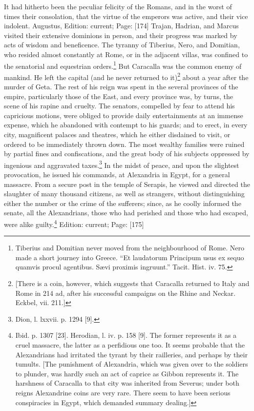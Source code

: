 It had hitherto been the peculiar felicity of the Romans, and in the worst of times their consolation, that the virtue of the emperors was active, and their vice indolent. Augustus, Edition: current; Page: [174] Trajan, Hadrian, and Marcus visited their extensive dominions in person, and their progress was marked by acts of wisdom and beneficence. The tyranny of Tiberius, Nero, and Domitian, who resided almost constantly at Rome, or in the adjacent villas, was confined to the senatorial and equestrian orders.\footnote{Tiberius and Domitian never moved from the neighbourhood of Rome. Nero made a short journey into Greece. \texthebrew{“}Et laudatorum Principum usus ex sequo quamvis procul agentibus. Sævi proximis ingruunt.\texthebrew{}” Tacit. Hist. iv. 75.} But Caracalla was the common enemy of mankind. He left the capital (and he never returned to it)\footnote{[There is a coin, however, which suggests that Caracalla returned to Italy and Rome in 214 ad, after his successful campaigns on the Rhine and Neckar. Eckbel, vii. 211.]} about a year after the murder of Geta. The rest of his reign was spent in the several provinces of the empire, particularly those of the East, and every province was, by turns, the scene of his rapine and cruelty. The senators, compelled by fear to attend his capricious motions, were obliged to provide daily entertainments at an immense expense, which he abandoned with contempt to his guards; and to erect, in every city, magnificent palaces and theatres, which he either disdained to visit, or ordered to be immediately thrown down. The most wealthy families were ruined by partial fines and confiscations, and the great body of his subjects oppressed by ingenious and aggravated taxes.\footnote{Dion, l. lxxvii. p. 1294 [9].} In the midst of peace, and upon the slightest provocation, he issued his commands, at Alexandria in Egypt, for a general massacre. From a secure post in the temple of Serapis, he viewed and directed the slaughter of many thousand citizens, as well as strangers, without distinguishing either the number or the crime of the sufferers; since, as he coolly informed the senate, all the Alexandrians, those who had perished and those who had escaped, were alike guilty.\footnote{Ibid. p. 1307 [23]. Herodian, l. iv. p. 158 [9]. The former represents it as a cruel massacre, the latter as a perfidious one too. It seems probable that the Alexandrians had irritated the tyrant by their railleries, and perhaps by their tumults. [The punishment of Alexandria, which was given over to the soldiers to plunder, was hardly such an act of caprice as Gibbon represents it. The harshness of Caracalla to that city was inherited from Severus; under both reigns Alexandrine coins are very rare. There seem to have been serious conspiracies in Egypt, which demanded summary dealing.]}
Edition: current; Page: [175]

